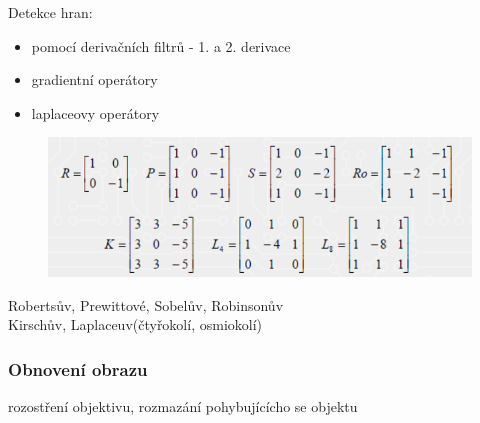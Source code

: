 Detekce hran:
\begin{itemize}
    \item pomocí derivačních filtrů - 1. a 2. derivace
    \item gradientní operátory
    \item laplaceovy operátory
\end{itemize}
\begin{figure}[H]
    \includegraphics[scale = 0.7]{images/hrany.png}
\end{figure}
Robertsův, Prewittové, Sobelův, Robinsonův\\
Kirschův, Laplaceuv(čtyřokolí, osmiokolí)\\

\subsubsection{Obnovení obrazu}
rozostření objektivu, rozmazání pohybujícícho se objektu\\

